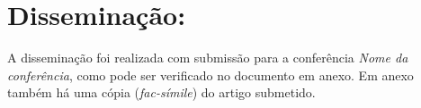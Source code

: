 \section{Disseminação:}

A disseminação foi realizada com submissão para a conferência \textit{Nome da conferência}, como pode ser verificado no documento em anexo. Em anexo também há uma cópia (\textit{fac-símile}) do artigo submetido.